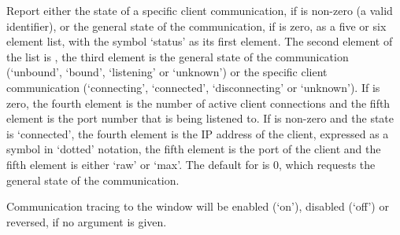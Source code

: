   Report either the state of a specific client communication, if  is non-zero
  (a valid identifier), or the general state of the communication, if  is zero,
  as a five or six element list, with the symbol `status' as its first element.
  The second element of the list is , the third element is the general state of
  the communication (`unbound', `bound', `listening' or `unknown') or the specific client
  communication (`connecting', `connected', `disconnecting' or `unknown').
  If  is zero, the fourth element is the number of active client connections and
  the fifth element is the port number that is being listened to.
  If  is non-zero and the state is `connected', the fourth element is the IP
  address of the client, expressed as a symbol in `dotted' notation, the fifth element is the
  port of the client and the fifth element is either `raw' or `max'.
  The default for  is 0, which requests the general state of the communication.

  Communication tracing to the \MaxName{} window will be enabled (`on'), disabled (`off') or
  reversed, if no argument is given.
  
  \objListCmdEnd

\objItemFile




%
